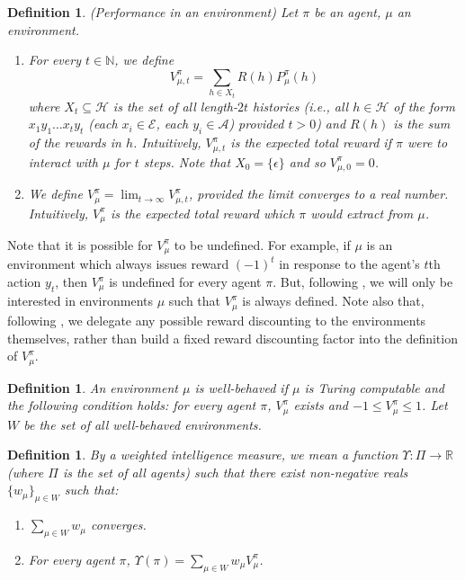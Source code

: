 \documentclass[twoside]{article}
\newtheorem{definition}[theorem]{Definition}
\begin{document}
\begin{definition}
\label{performancedefn}
    (Performance in an environment)
    Let $\pi$ be an agent, $\mu$ an environment.
    \begin{enumerate}
    \item
        For every $t\in\mathbb N$,
        we define
        \[
            V^\pi_{\mu,t}=\sum_{h\in X_t}R(h)P^\pi_\mu(h)
        \]
        where $X_t\subseteq\mathcal H$ is the set of all
        length-$2t$ histories (i.e., all $h\in\mathcal H$ of the form
        $x_1y_1\ldots x_ty_t$ (each $x_i\in\mathcal E$, each $y_i\in\mathcal A$)
        provided $t>0$) and $R(h)$ is the sum of the rewards in $h$.
        Intuitively, $V^\pi_{\mu,t}$ is the expected total reward
        if $\pi$ were to interact with $\mu$ for $t$ steps.
        Note that $X_0=\{\epsilon\}$ and so $V^\pi_{\mu,0}=0$.
    \item
        We define $V^\pi_\mu=\lim_{t\to\infty}V^\pi_{\mu,t}$,
        provided the limit converges to a real number.
        Intuitively, $V^\pi_\mu$ is the expected total reward which $\pi$ would extract
        from $\mu$.
    \end{enumerate}
\end{definition}

Note that it is possible for $V^\pi_\mu$ to be undefined.
For example, if $\mu$ is an environment which always issues
reward $(-1)^t$ in response to the agent's $t$th action $y_t$,
then $V^\pi_\mu$ is undefined for every agent $\pi$.
But, following \cite{legg2007universal}, we will only be interested in
environments $\mu$ such that $V^\pi_\mu$
is always defined. Note also that, following \cite{legg2007universal},
we delegate any possible reward discounting to the environments themselves,
rather than build a fixed reward discounting factor into the definition
of $V^\pi_\mu$.

\begin{definition}
\label{wellbehaveddefn}
    An environment $\mu$ is \emph{well-behaved} if $\mu$ is Turing
    computable and the following
    condition holds: for every agent $\pi$, $V^\pi_\mu$ exists and
    $-1\leq V^\pi_\mu\leq 1$. Let $W$ be the set of all well-behaved environments.
\end{definition}

\begin{definition}
\label{performanceaveragerdefn}
    By a \emph{weighted intelligence measure}, we mean a function
    $\Upsilon:\Pi\to \mathbb R$ (where $\Pi$ is the set of all agents)
    such that there exist non-negative reals $\{w_\mu\}_{\mu\in W}$ such that:
    \begin{enumerate}
        \item
        $\sum_{\mu\in W}w_\mu$ converges.
        \item
        For every agent $\pi$, $\Upsilon(\pi)=\sum_{\mu\in W}w_\mu V^\pi_\mu$.
    \end{enumerate}
\end{definition}
\end{document}
